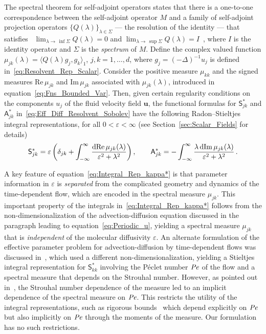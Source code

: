 \documentclass[leqno,onefignum,onetabnum]{siamltex1213}
\newcommand{\secref}[1]{Section~\ref{#1}}
\renewcommand{\d}{\mathrm{d}}
\newcommand\Real{\mbox{Re}\,} %
\newcommand\Imag{\mbox{Im}\,} %
\newcommand{\Sm}{\mathsf{S}}
\newcommand{\Am}{\mathsf{A}}
\newcommand\Pen{\mbox{\textit{Pe}}}  %
\newcommand{\vecu}{\boldsymbol{u}}
\begin{document}
The spectral theorem for self-adjoint operators states that there is a
one-to-one correspondence between the self-adjoint operator $M$ and a
family of self-adjoint projection operators $\{Q(\lambda)\}_{\lambda\in\Sigma}$ --- the
resolution of the identity --- that satisfies~\cite{Stone:64} 
$\lim_{\lambda\to\,\inf{\Sigma}}Q(\lambda)=0$ and
$\lim_{\lambda\to\,\sup{\Sigma}}Q(\lambda)=I$~\cite{Stone:64}, where $I$ is the identity
operator and $\Sigma$ is the \emph{spectrum} of $M$. Define the complex
valued function $\mu_{jk}(\lambda)=\langle Q(\lambda)g_j,g_k\rangle_1$, $j,k=1,\ldots,d$, where
$g_j=(-\Delta)^{-1}u_j$ is defined
in~\eqref{eq:Resolvent_Rep_Scalar}. Consider the positive measure
$\mu_{kk}$ and the signed measures $\Real\mu_{jk}$ and $\Imag\mu_{jk}$
associated with $\mu_{jk}(\lambda)$, introduced in
equation~\eqref{eq:Fns_Bounded_Var}.  Then, given certain regularity 
conditions on the components $u_j$ of the fluid velocity field
$\vecu$, the functional formulas for $\Sm^*_{jk}$ and
$\Am^*_{jk}$ in~\eqref{eq:Eff_Diff_Resolvent_Sobolev} have
the following Radon--Stieltjes integral representations, for all
$0<\varepsilon<\infty$ (see \secref{sec:Scalar_Fields} for details)
%
\begin{align}\label{eq:Integral_Rep_kappa*}
  \Sm^*_{jk}=\varepsilon\left(\delta_{jk}+\int_{-\infty}^\infty\frac{\d{\rm Re}\,\mu_{jk}(\lambda)}{\varepsilon^2+\lambda^2}\right),
  \qquad
  \Am^*_{jk}=-\int_{-\infty}^\infty\frac{\lambda\,\d{\rm Im}\,\mu_{jk}(\lambda)}{\varepsilon^2+\lambda^2}\,.         
\end{align}
%


A key feature of equation~\eqref{eq:Integral_Rep_kappa*} is that
parameter information in $\varepsilon$ is \emph{separated} from the complicated
geometry and dynamics of the time-dependent flow, which are encoded
in the spectral measure $\mu_{jk}$. This important property of the integrals
in~\eqref{eq:Integral_Rep_kappa*} follows from the
non-dimensionalization of the advection-diffusion equation discussed
in the paragraph leading 
to equation~\eqref{eq:Periodic_u}, yielding a spectral measure $\mu_{jk}$ that
is \emph{independent} of the molecular diffusivity $\varepsilon$. An alternate
formulation of the effective parameter problem for advection-diffusion
by time-dependent flows was discussed in~\cite{Avellaneda:PRE:3249},
which used a different 
non-dimensionalization, yielding a Stieltjes integral representation
for $\Sm^*_{kk}$ involving the P{\'e}clet number $\Pen$ of the flow and a
spectral measure that depends on the Strouhal number. However, as pointed
out in~\cite{Bonn:McLaughlin:JFM:2001:345}, the Strouhal number
dependence of the measure led to an implicit
dependence of the spectral measure on $\Pen$. This restricts the
utility of the integral representations, such as rigorous
bounds~\cite{Baker:1996:Book:Pade,Golden:CMP-473} which depend
explicitly on $\Pen$ but also implicitly on $\Pen$ through the
moments of the measure. Our formulation has no such restrictions. 
\end{document}

